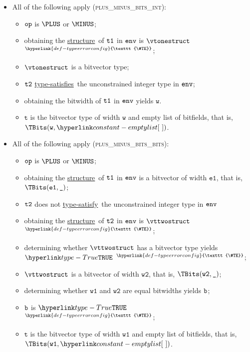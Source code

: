 \documentclass{book}
\newcommand\TypeErrorConfig[0]{\hyperlink{def-typeerrorconfig}{\texttt{\#TE}}}
\newcommand\ProseOrTypeError[0]{\hyperlink{def-proseortypeerror}{$^{\TypeErrorConfig}$}}
\newcommand\structure[0]{\hyperlink{def-structure}{structure}}
\newcommand\typesatisfies[0]{\hyperlink{def-typesatisfies}{type-satisfies}}
\newcommand\typesatisfy[0]{\hyperlink{def-typesatisfies}{type-satisfy}}
\newcommand\vt[0]{\texttt{t}}
\newcommand\veone[0]{\texttt{e1}}
\newcommand\vw[0]{\texttt{w}}
\newcommand\vwone[0]{\texttt{w1}}
\newcommand\vwtwo[0]{\texttt{w2}}
\begin{document}
\begin{itemize}
  \item All of the following apply (\textsc{plus\_minus\_bits\_int}):
  \begin{itemize}
    \item $\texttt{op}$ is $\PLUS$ or $\MINUS$;
    \item obtaining the \structure\ of $\texttt{t1}$ in $\texttt{env}$ is $\vtonestruct$ \ProseOrTypeError;
    \item $\vtonestruct$ is a bitvector type;
    \item $\texttt{t2}$ \typesatisfies\ the unconstrained integer type in $\texttt{env}$;
    \item obtaining the bitwidth of $\texttt{t1}$ in $\texttt{env}$ yields $\vw$.
    \item $\vt$ is the bitvector type of width $\vw$ and empty list of bitfields, that is, \\ $\TBits(\vw, \emptylist)$.
  \end{itemize}

  \item All of the following apply (\textsc{plus\_minus\_bits\_bits}):
  \begin{itemize}
    \item $\texttt{op}$ is $\PLUS$ or $\MINUS$;
    \item obtaining the \structure\ of $\texttt{t1}$ in $\texttt{env}$ is a bitvector of width $\veone$, that is,\\ $\TBits(\veone, \Ignore)$;
    \item $\texttt{t2}$ does not \typesatisfy\ the unconstrained integer type in $\texttt{env}$
    \item obtaining the \structure\ of $\texttt{t2}$ in $\texttt{env}$ is $\vttwostruct$ \ProseOrTypeError;
    \item determining whether $\vttwostruct$ has a bitvector type yields $\True$ \ProseOrTypeError;
    \item $\vttwostruct$ is a bitvector of width $\vwtwo$, that is, $\TBits(\vwtwo, \Ignore)$;
    \item determining whether $\vwone$ and $\vwtwo$ are equal bitwidths yields $\texttt{b}$;
    \item $\texttt{b}$ is $\True$ \ProseOrTypeError;
    \item $\vt$ is the bitvector type of width $\vwone$ and empty list of bitfields, that is, \\ $\TBits(\vwone, \emptylist)$.
  \end{itemize}


\end{itemize}
\end{document}
